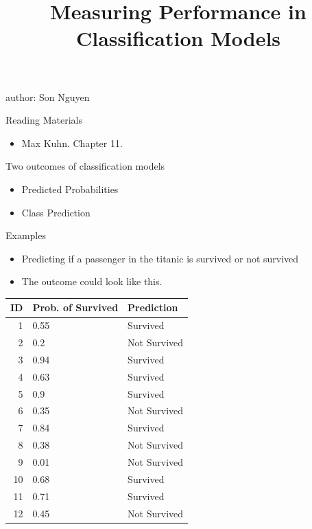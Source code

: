 \documentclass[
  ignorenonframetext,
]{beamer}
\title{Measuring Performance in Classification Models}
\author{}
\date{\vspace{-2.5em}}
\providecommand{\tightlist}{%
  \setlength{\itemsep}{0pt}\setlength{\parskip}{0pt}}
\begin{document}
\frame{\titlepage}

\begin{frame}
author: Son Nguyen
\end{frame}

\begin{frame}{Reading Materials}
\protect\hypertarget{reading-materials}{}
\begin{itemize}
\tightlist
\item
  Max Kuhn. Chapter 11.
\end{itemize}
\end{frame}

\begin{frame}{Two outcomes of classification models}
\protect\hypertarget{two-outcomes-of-classification-models}{}
\begin{itemize}
\tightlist
\item
  Predicted Probabilities
\item
  Class Prediction
\end{itemize}
\end{frame}

\begin{frame}{Examples}
\protect\hypertarget{examples}{}
\begin{itemize}
\tightlist
\item
  Predicting if a passenger in the titanic is survived or not survived
\item
  The outcome could look like this.
\end{itemize}

\begin{longtable}[]{@{}rll@{}}
\toprule
ID & Prob. of Survived & Prediction \\
\midrule
\endhead
1 & 0.55 & Survived \\
2 & 0.2 & Not Survived \\
3 & 0.94 & Survived \\
4 & 0.63 & Survived \\
5 & 0.9 & Survived \\
6 & 0.35 & Not Survived \\
7 & 0.84 & Survived \\
8 & 0.38 & Not Survived \\
9 & 0.01 & Not Survived \\
10 & 0.68 & Survived \\
11 & 0.71 & Survived \\
12 & 0.45 & Not Survived \\
\bottomrule
\end{longtable}
\end{frame}
\end{document}
